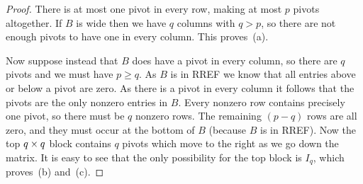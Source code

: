 \documentclass[reqno]{amsart}
\theoremstyle{definition}
\begin{document}
\begin{proof}
 There is at most one pivot in every row, making at most $p$ pivots
 altogether.  If $B$ is wide then we have $q$ columns with $q>p$, so
 there are not enough pivots to have one in every column.  This
 proves~(a).

 Now suppose instead that $B$ does have a pivot in every column, so
 there are $q$ pivots and we must have $p\geq q$.  As $B$ is in RREF
 we know that all entries above or below a pivot are zero.  As there
 is a pivot in every column it follows that the pivots are the only
 nonzero entries in $B$.  Every nonzero row contains precisely one
 pivot, so there must be $q$ nonzero rows.  The remaining $(p-q)$ rows
 are all zero, and they must occur at the bottom of $B$ (because $B$
 is in RREF).  Now the top $q\times q$ block contains $q$ pivots which
 move to the right as we go down the matrix.  It is easy to see that
 the only possibility for the top block is $I_q$, which proves~(b)
 and~(c).
\end{proof}
\end{document}
